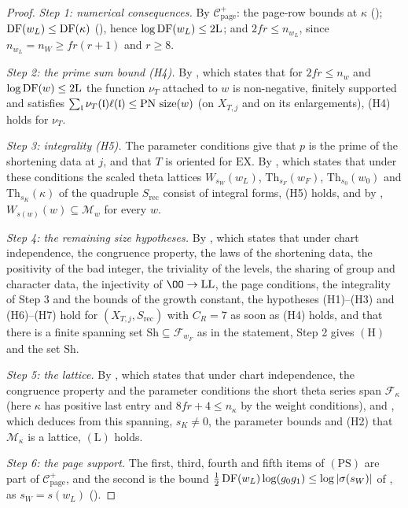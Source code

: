 \begin{proof}
\emph{Step 1: numerical consequences.} By $\mathcal C^+_{\mathrm{page}}$: the page-row bounds at $\kappa$
(); $\operatorname{DF}(w_L)\le\operatorname{DF}(\kappa)$
(), hence $\log\operatorname{DF}(w_L)\le2\mathrm L$; and $2fr\le n_{w_L}$, since
$n_{w_L}=n_W\ge fr(r+1)$ and $r\ge8$.

\emph{Step 2: the prime sum bound (H4).} By , which states that for
$2fr\le n_w$ and $\log\operatorname{DF}(w)\le2\mathrm L$ the function $\nu_T$ attached to $w$ is non-negative, finitely supported and
satisfies $\sum_{\mathfrak l}\nu_T(\mathfrak l)\ell(\mathfrak l)\le\mathrm{PN}\,\operatorname{size}(w)$ (on $X_{T,j}$ and on its enlargements),
(H4) holds for $\nu_T$.

\emph{Step 3: integrality (H5).} The parameter conditions give that $p$ is the prime of the shortening data at $j$, and that
$T$ is oriented for $\mathrm{EX}$. By , which states that under these
conditions the scaled theta lattices $W_{s_W}(w_L)$, $\mathrm{Th}_{s_F}(w_F)$, $\mathrm{Th}_{s_0}(w_0)$ and $\mathrm{Th}_{s_K}(\kappa)$ of the
quadruple $S_{\mathrm{rec}}$ consist of integral forms, (H5) holds, and by
, $W_{s(w)}(w)\subseteq\mathcal M_w$ for every $w$.

\emph{Step 4: the remaining size hypotheses.} By , which
states that under chart independence, the congruence property, the laws of the shortening data, the positivity of the
bad integer, the triviality of the levels, the sharing of group and character data, the injectivity of $\OO\to\mathrm{LL}$,
the page conditions, the integrality of Step 3 and the bounds of the growth constant, the hypotheses (H1)--(H3) and
(H6)--(H7) hold for $(X_{T,j},S_{\mathrm{rec}})$ with $C_R=7$ as soon as (H4) holds, and that there is a finite spanning set
$\mathrm{Sh}\subseteq\mathcal F_{w_F}$ as in the statement, Step 2 gives $(\mathrm H)$ and the set $\mathrm{Sh}$.

\emph{Step 5: the lattice.} By , which states that under chart
independence, the congruence property and the parameter conditions the short theta series span $\mathcal F_\kappa$ (here
$\kappa$ has positive last entry and $8fr+4\le n_\kappa$ by the weight conditions), and
, which deduces from this spanning, $s_K\ne0$, the
parameter bounds and (H2) that $\mathcal M_\kappa$ is a lattice, $(\mathrm L)$ holds.

\emph{Step 6: the page support.} The first, third, fourth and fifth items of $(\mathrm{PS})$ are part of $\mathcal C^+_{\mathrm{page}}$,
and the second is the bound $\frac12\operatorname{DF}(w_L)\log(g_0g_1)\le\log|\sigma(s_W)|$ of
, as $s_W=s(w_L)$ ().
\end{proof}

